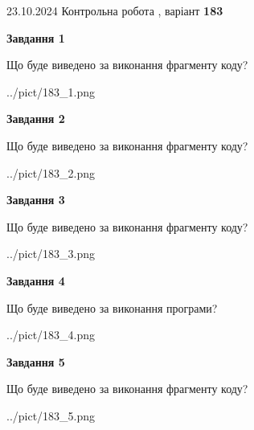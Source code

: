 \documentclass[12pt, ukrainian]{article}
\begin{document}
{\Large{23.10.2024 Контрольна робота , варіант  \No \textbf { 183 }\par}}
{
\begin {large}
{\begin {center}\textbf{Завдання 1}\end {center}}

Що буде виведено за виконання фрагменту коду?\par
\begin{center}
	{../pict/183_1.png}
\end{center}
\newpage

{\begin {center}\textbf{Завдання 2}\end {center}}

Що буде виведено за виконання фрагменту коду?\par
\begin{center}
	{../pict/183_2.png}
\end{center}
\newpage

{\begin {center}\textbf{Завдання 3}\end {center}}

Що буде виведено за виконання фрагменту коду?\par
\begin{center}
	{../pict/183_3.png}
\end{center}
\newpage

{\begin {center}\textbf{Завдання 4}\end {center}}

Що буде виведено за виконання програми?\par
\begin{center}
	{../pict/183_4.png}
\end{center}
\newpage

{\begin {center}\textbf{Завдання 5}\end {center}}

Що буде виведено за виконання фрагменту коду?\par
\begin{center}
	{../pict/183_5.png}
\end{center}
\newpage


\end{large}}
\end{document}
